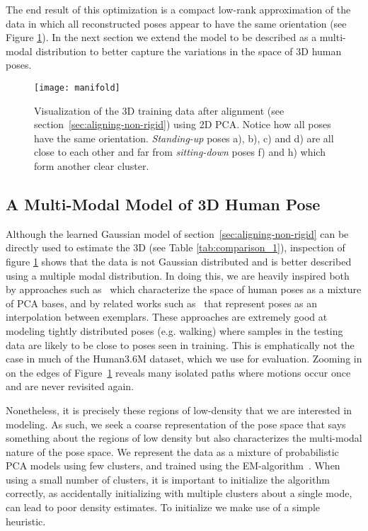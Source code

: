 \documentclass[10pt,twocolumn,letterpaper]{article}
\begin{document}
The end result of this optimization is a compact low-rank
approximation of the data in which all reconstructed poses appear to
have the same orientation (see Figure \ref{fig:manifold}). In the next
section we extend the  model to be described as a multi-modal
distribution to better capture the variations in the space of 3D human
poses.
\begin{figure}[tb]
  \begin{center}
    \vspace{-7mm}
  \texttt{[image: manifold]}
\end{center}
    \vspace{-7mm}
   \caption{\small Visualization of the 3D training data after alignment (see
     section~\ref{sec:aligning-non-rigid}) using 2D PCA. Notice how
     all poses have the same orientation.  \emph{Standing-up} poses
     a), b), c) and d) are all close to each other and far from
     \emph{sitting-down} poses f) and h) which form another clear
     cluster.
     \label{fig:manifold}\vspace{-7mm}}
\end{figure}
\subsection{A Multi-Modal Model of 3D Human Pose}
\label{sec:learn-align}
Although the learned Gaussian model of
section~\ref{sec:aligning-non-rigid} can be directly used to estimate the 3D
(see Table \ref{tab:comparison_1}), inspection of figure
\ref{fig:manifold} shows that the data is not Gaussian distributed and
is better described using a multiple modal distribution. In doing
this, we are heavily inspired both by approaches such
as~\cite{pitelis2013learning} which characterize the space of human
poses as a mixture of PCA bases, and by related works such
as~\cite{wang2014representing,bregler2000recovering} that represent
poses as an interpolation between exemplars. These approaches are
extremely good at modeling tightly distributed poses (e.g. walking)
where samples in the testing data are likely to be close to poses seen
in training.  This is emphatically not the case in much of the
Human3.6M dataset, which we use for evaluation. Zooming in on the
edges of Figure~\ref{fig:manifold} reveals many isolated paths where
motions occur once and are never revisited again.

Nonetheless, it is precisely these regions of low-density that we are
interested in modeling. As such, we seek a coarse representation of
the pose space that says something about the regions of low density
but also characterizes the multi-modal nature of the pose space.  We
 represent the  data as a mixture of probabilistic PCA models
using few clusters, and trained using the
EM-algorithm~\cite{Tipping99probabilisticprincipal}. When using a
small number of clusters, it is important to initialize the algorithm
correctly, as accidentally initializing with multiple clusters about a
single mode, can lead to poor density estimates. To initialize we make use of a simple heuristic.
\end{document}

